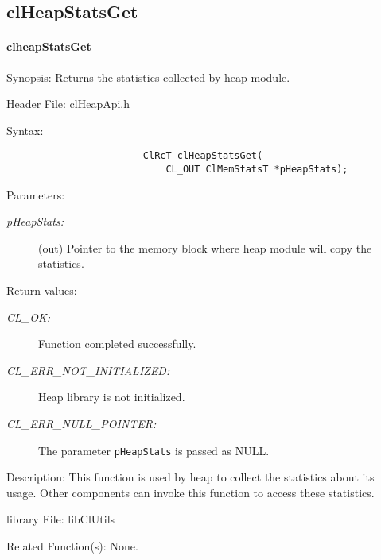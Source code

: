 \begin{flushleft}
\subsection{clHeapStatsGet}
\hypertarget{pageheap111}{}\paragraph{cl\-heap\-Stats\-Get}\label{pageheap111}
\begin{Desc}
\item[Synopsis:]Returns the statistics collected by heap module. \end{Desc}
\begin{Desc}
\item[Header File:]clHeapApi.h\end{Desc}
\begin{Desc}
\item[Syntax:]
\footnotesize\begin{verbatim}
            			ClRcT clHeapStatsGet(
            			    CL_OUT ClMemStatsT *pHeapStats);
\end{verbatim}
\normalsize
\end{Desc}
\begin{Desc}
\item[Parameters:]
\begin{description}
\item[{\em pHeapStats:}](out) Pointer to the memory block where heap module will copy the statistics.
\end{description}
\end{Desc}
\begin{Desc}
\item[Return values:]
\begin{description}
\item[{\em CL\_\-OK:}] Function completed successfully.
\item[{\em CL\_\-ERR\_\-NOT\_\-INITIALIZED:}] Heap library is not initialized.
\item[{\em CL\_\-ERR\_\-NULL\_\-POINTER:}] The parameter {\tt{pHeapStats}} is passed as NULL.
\end{description}
\end{Desc}
\begin{Desc}
\item[Description:] This function is used by heap to collect the statistics about its usage. Other components can invoke this function to access these
statistics.
\end{Desc}
\begin{Desc}
\item[library File:]lib\-Cl\-Utils\end{Desc}
\begin{Desc}
\item[Related Function(s):]None. \end{Desc}
\newpage



\end{flushleft}
